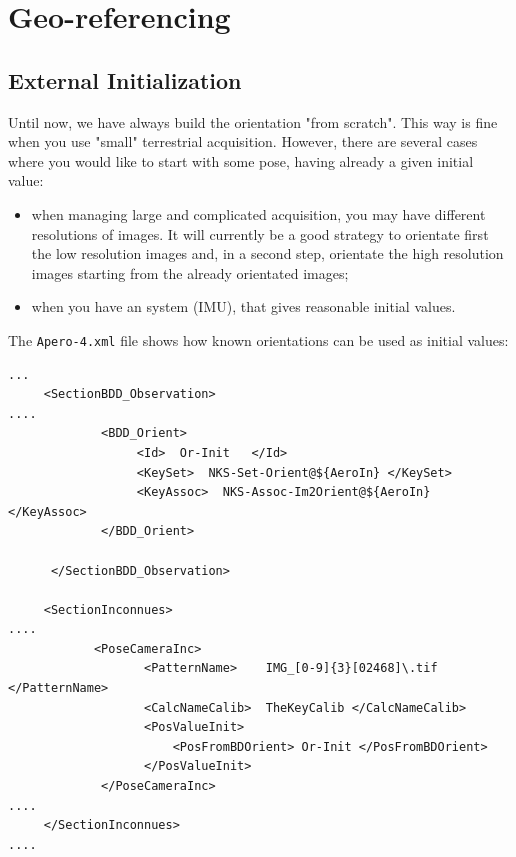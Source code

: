 
\section{Geo-referencing}

\subsection{External Initialization}

Until now, we have always build the orientation "from scratch". This way is 
fine when you use "small" terrestrial acquisition. However, there are
several cases where you would like to start with some pose, having
already a given initial value:

\begin{itemize}
   \item when managing large and complicated acquisition, you may have
         different resolutions of images. It will currently be a good strategy to
         orientate first the low resolution images and, in a second step,
         orientate the high resolution images starting from the already orientated images;
        
   \item when you have an  %
    system (IMU), that gives reasonable initial values.
\end{itemize}

The {\tt Apero-4.xml} file shows how known orientations can be used as initial 
values:

{\scriptsize
\begin{verbatim}
...
     <SectionBDD_Observation>
....
             <BDD_Orient>
                  <Id>  Or-Init   </Id>
                  <KeySet>  NKS-Set-Orient@${AeroIn} </KeySet>
                  <KeyAssoc>  NKS-Assoc-Im2Orient@${AeroIn} </KeyAssoc>
             </BDD_Orient>

      </SectionBDD_Observation>

     <SectionInconnues>
....
            <PoseCameraInc>
                   <PatternName>    IMG_[0-9]{3}[02468]\.tif  </PatternName>
                   <CalcNameCalib>  TheKeyCalib </CalcNameCalib>
                   <PosValueInit>
                       <PosFromBDOrient> Or-Init </PosFromBDOrient>
                   </PosValueInit>
             </PoseCameraInc>
....
     </SectionInconnues>
....
\end{verbatim}
}

